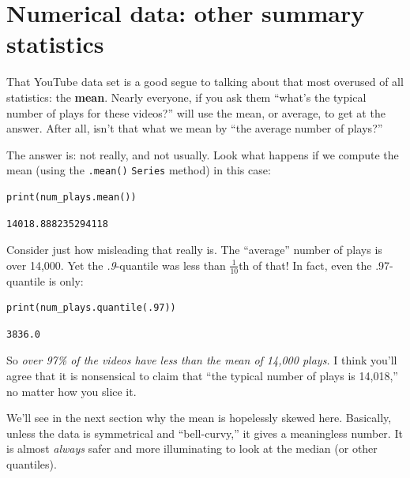 \section{Numerical data: other summary statistics}


That YouTube data set is a good segue to talking about that most overused of
all statistics: the \textbf{mean}. Nearly everyone, if you ask them ``what's
the typical number of plays for these videos?'' will use the mean, or average,
to get at the answer. After all, isn't that what we mean by ``the average
number of plays?''

The answer is: not really, and not usually. Look what happens if we compute the
mean (using the \texttt{.mean()} \texttt{Series} method) in this case:

\begin{Verbatim}[fontsize=\small,samepage=true,frame=single,framesep=3mm]
print(num_plays.mean())
\end{Verbatim}
\vspace{-.3in}

\begin{Verbatim}[fontsize=\small,samepage=true,frame=leftline,framesep=5mm,framerule=1mm]
14018.888235294118
\end{Verbatim}

Consider just how misleading that really is. The ``average'' number of plays is
over 14,000. Yet the \textit{.9}-quantile was less than $\frac{1}{10}$th of that!
In fact, even the .97-quantile is only:

\begin{Verbatim}[fontsize=\small,samepage=true,frame=single,framesep=3mm]
print(num_plays.quantile(.97))
\end{Verbatim}
\vspace{-.3in}

\begin{Verbatim}[fontsize=\small,samepage=true,frame=leftline,framesep=5mm,framerule=1mm]
3836.0
\end{Verbatim}

So \textit{over 97\% of the videos have less than the mean of 14,000 plays.} I
think you'll agree that it is nonsensical to claim that ``the typical number of
plays is 14,018,'' no matter how you slice it.


We'll see in the next section why the mean is hopelessly skewed here.
Basically, unless the data is symmetrical and ``bell-curvy,'' it gives a
meaningless number. It is almost \textit{always} safer and more illuminating to
look at the median (or other quantiles).


